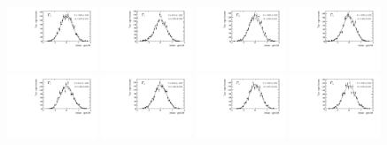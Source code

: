 \begin{figure}
\centering
\includegraphics[width=0.24\textwidth]{figs/kpimm/angular-analysis/toys/pull_m_2.pdf}
\includegraphics[width=0.24\textwidth]{figs/kpimm/angular-analysis/toys/pull_m_3.pdf}
\includegraphics[width=0.24\textwidth]{figs/kpimm/angular-analysis/toys/pull_m_4.pdf}
\includegraphics[width=0.24\textwidth]{figs/kpimm/angular-analysis/toys/pull_m_5.pdf}
\includegraphics[width=0.24\textwidth]{figs/kpimm/angular-analysis/toys/pull_m_6.pdf}
\includegraphics[width=0.24\textwidth]{figs/kpimm/angular-analysis/toys/pull_m_7.pdf}
\includegraphics[width=0.24\textwidth]{figs/kpimm/angular-analysis/toys/pull_m_8.pdf}
\includegraphics[width=0.24\textwidth]{figs/kpimm/angular-analysis/toys/pull_m_9.pdf}

\end{figure}
